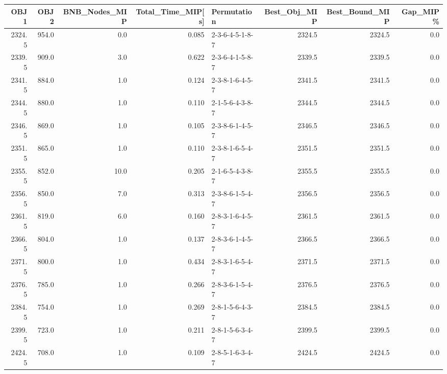 \begin{tabular}{rrrrlrrr}
\toprule
   OBJ1 &   OBJ2 &  BNB\_Nodes\_MIP &  Total\_Time\_MIP[s] &      Permutation &  Best\_Obj\_MIP &  Best\_Bound\_MIP &  Gap\_MIP\% \\
\midrule
 2324.5 &  954.0 &            0.0 &              0.085 &  2-3-6-4-5-1-8-7 &        2324.5 &          2324.5 &       0.0 \\
 2339.5 &  909.0 &            3.0 &              0.622 &  2-3-6-4-1-5-8-7 &        2339.5 &          2339.5 &       0.0 \\
 2341.5 &  884.0 &            1.0 &              0.124 &  2-3-8-1-6-4-5-7 &        2341.5 &          2341.5 &       0.0 \\
 2344.5 &  880.0 &            1.0 &              0.110 &  2-1-5-6-4-3-8-7 &        2344.5 &          2344.5 &       0.0 \\
 2346.5 &  869.0 &            1.0 &              0.105 &  2-3-8-6-1-4-5-7 &        2346.5 &          2346.5 &       0.0 \\
 2351.5 &  865.0 &            1.0 &              0.110 &  2-3-8-1-6-5-4-7 &        2351.5 &          2351.5 &       0.0 \\
 2355.5 &  852.0 &           10.0 &              0.205 &  2-1-6-5-4-3-8-7 &        2355.5 &          2355.5 &       0.0 \\
 2356.5 &  850.0 &            7.0 &              0.313 &  2-3-8-6-1-5-4-7 &        2356.5 &          2356.5 &       0.0 \\
 2361.5 &  819.0 &            6.0 &              0.160 &  2-8-3-1-6-4-5-7 &        2361.5 &          2361.5 &       0.0 \\
 2366.5 &  804.0 &            1.0 &              0.137 &  2-8-3-6-1-4-5-7 &        2366.5 &          2366.5 &       0.0 \\
 2371.5 &  800.0 &            1.0 &              0.434 &  2-8-3-1-6-5-4-7 &        2371.5 &          2371.5 &       0.0 \\
 2376.5 &  785.0 &            1.0 &              0.266 &  2-8-3-6-1-5-4-7 &        2376.5 &          2376.5 &       0.0 \\
 2384.5 &  754.0 &            1.0 &              0.269 &  2-8-1-5-6-4-3-7 &        2384.5 &          2384.5 &       0.0 \\
 2399.5 &  723.0 &            1.0 &              0.211 &  2-8-1-5-6-3-4-7 &        2399.5 &          2399.5 &       0.0 \\
 2424.5 &  708.0 &            1.0 &              0.109 &  2-8-5-1-6-3-4-7 &        2424.5 &          2424.5 &       0.0 \\
\bottomrule
\end{tabular}
